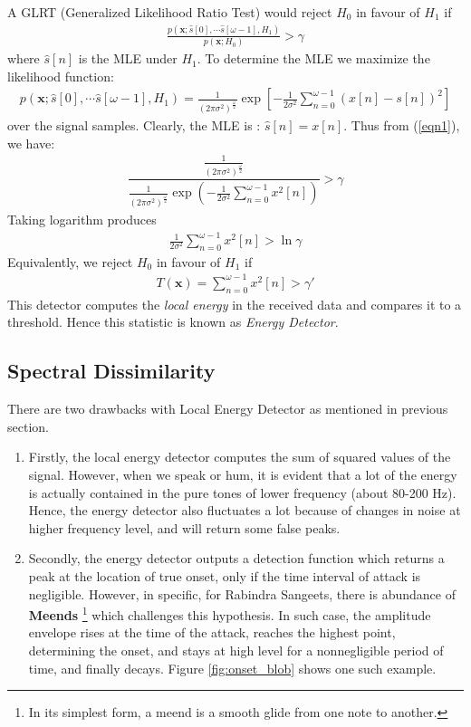 \documentclass[10pt]{article}
\begin{document}
A GLRT (Generalized Likelihood Ratio Test) would reject $H_0$ in favour of $H_1$ if 
\begin{align}
    \frac{p(\textbf{x};\hat{s}[0], \cdots \hat{s}[\omega-1], H_1) }{p(\textbf{x};H_0)} > \gamma
    \label{eqn1}
\end{align}
where $\hat{s}[n]$ is the MLE under $H_1$. To determine the MLE we maximize the likelihood function:
\begin{align*}
  p(\textbf{x};\hat{s}[0], \cdots \hat{s}[\omega-1], H_1)=\frac{1}{(2\pi\sigma^2)^\frac{\omega}{2}}\exp\left[-\frac{1}{2\sigma^2}\displaystyle\sum_{n=0}^{\omega-1}(x[n]-s[n])^2\right] 
\end{align*}
over the signal samples. Clearly, the MLE is : $\hat{s}[n]=x[n]$. Thus from (\ref{eqn1}), we have:
\begin{align*}
    \dfrac{\frac{1}{(2\pi\sigma^2)^\frac{\omega}{2}}}{\frac{1}{(2\pi\sigma^2)^\frac{\omega}{2}}\exp \left(-\frac{1}{2\sigma^2}\displaystyle\sum_{n=0}^{\omega-1}x^2[n]\right)} > \gamma
\end{align*}
Taking logarithm produces
\begin{align*}
    \frac{1}{2\sigma^2}\displaystyle\sum_{n=0}^{\omega-1}x^2[n]> \ln \gamma
\end{align*}
Equivalently, we reject $H_0$ in favour of $H_1$ if
\begin{align}
   T(\textbf{x})= \displaystyle\sum_{n=0}^{\omega-1}x^2[n] > \gamma'
   \label{eqn2}
\end{align}
This detector computes the \textit{local energy} in the received data and compares it to a threshold. Hence this statistic is known as \textit{Energy Detector}.

\subsection{Spectral Dissimilarity}
\qquad There are two drawbacks with Local Energy Detector as mentioned in previous section.
\begin{enumerate}
    \item Firstly, the local energy detector computes the sum of squared values of the signal. However, when we speak or hum, it is evident that a lot of the energy is actually contained in the pure tones of lower frequency (about 80-200 Hz). Hence, the energy detector also fluctuates a lot because of changes in noise at higher frequency level, and will return some false peaks.
    \item Secondly, the energy detector outputs a detection function which returns a peak at the location of true onset, only if the time interval of attack is negligible. However, in specific, for Rabindra Sangeets, there is abundance of \textbf{Meends} \footnote{In its simplest form, a meend is a smooth glide from one note to another.} which challenges this hypothesis. In such case, the amplitude envelope rises at the time of the attack, reaches the highest point, determining the onset, and stays at high level for a nonnegligible period of time, and finally decays. Figure \ref{fig:onset_blob} shows one such example.
\end{enumerate}
\end{document}
